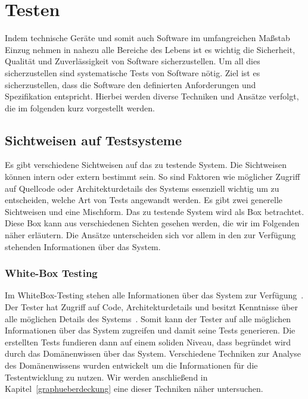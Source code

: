 \newpage
\section{Testen}
\label{test}

Indem technische Geräte und somit auch Software im umfangreichen Maßstab Einzug nehmen in nahezu alle Bereiche des
Lebens ist es wichtig die Sicherheit, Qualität und Zuverlässigkeit von Software sicherzustellen. \cite[vgl. Introduction]{software-testing}
Um all dies sicherzustellen sind systematische Tests von Software nötig.
Ziel ist es sicherzustellen, dass die Software den definierten Anforderungen und Spezifikation entspricht.
Hierbei werden diverse Techniken und Ansätze verfolgt, die im folgenden kurz vorgestellt werden.

\subsection{Sichtweisen auf Testsysteme}

Es gibt verschiedene Sichtweisen auf das zu testende System.
Die Sichtweisen können intern oder extern bestimmt sein.
So sind Faktoren wie möglicher Zugriff auf Quellcode oder Architekturdetails des Systems essenziell wichtig um
zu entscheiden, welche Art von Tests angewandt werden.
Es gibt zwei generelle Sichtweisen und eine Mischform.
Das zu testende System wird als Box betrachtet.
Diese Box kann aus verschiedenen Sichten gesehen werden, die wir im Folgenden näher erläutern.
Die Ansätze unterscheiden sich vor allem in den zur Verfügung stehenden Informationen über das System.

\subsubsection{White-Box Testing}

Im WhiteBox-Testing stehen alle Informationen über das System zur Verfügung~\cite[vgl. 1.4.2 Code-Based Testing]{software-testing-craftmans}.
Der Tester hat Zugriff auf Code, Architekturdetails und besitzt Kenntnisse über alle möglichen Details des Systems~\cite[vgl. 1.4.2 Code-Based Testing]{software-testing-craftmans}.
Somit kann der Tester auf alle möglichen Informationen über das System zugreifen und damit seine Tests generieren.
Die erstellten Tests fundieren dann auf einem soliden Niveau, dass begründet wird durch das Domänenwissen über das System.
Verschiedene Techniken zur Analyse des Domänenwissens wurden entwickelt um die Informationen für die Testentwicklung zu nutzen.
Wir werden anschließend in Kapitel~\ref{graphueberdeckung} eine dieser Techniken näher untersuchen.

